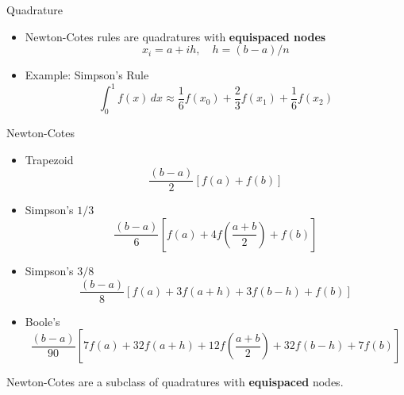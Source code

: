 \documentclass[10pt]{beamer}
\begin{document}
\begin{frame}{Quadrature}

\vspace{5pt}

\begin{itemize}
  \item  Newton-Cotes rules are quadratures with \textbf{equispaced nodes}  
        $$x_i = a+ih, \quad  h=(b-a)/n$$
  \item Example: Simpson's Rule 
$$    \int_0^1 f(x)\,dx \approx \frac{1}{6} f(x_0) + \frac{2}{3}
    f(x_1) + \frac{1}{6}f(x_2)$$
\end{itemize}
\end{frame}
\begin{frame}{Newton-Cotes}

\begin{itemize}
    \item Trapezoid       $$\frac{(b-a)}{2}\left[f(a) + f(b)\right]$$
    
   \item Simpson's $1/3$ $$\frac{(b-a)}{6}\left[f(a) + 4f(\frac{a+b}{2}) + f(b)\right]$$
   \item Simpson's $3/8$ $$\frac{(b-a)}{8}\left[f(a) + 3f(a+h) + 3f(b-h) + f(b)\right]$$
   \item Boole's         $$\frac{(b-a)}{90}\left[7f(a) + 32f(a+h) + 12f(\frac{a+b}{2}) + 32f(b-h)+7f(b)\right]$$
\end{itemize}

    \begin{alertblock}{}
    Newton-Cotes are a subclass of quadratures with \textbf{equispaced} nodes.
    \end{alertblock}
\end{frame}
\end{document}
